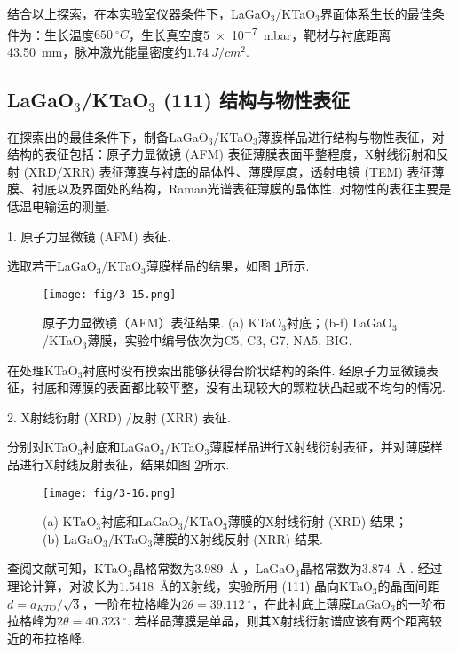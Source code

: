 \documentclass[12pt,a4paper,openany,twoside,UTF-8]{book}
\begin{document}
结合以上探索，在本实验室仪器条件下，LaGaO$_3$/KTaO$_3$界面体系生长的最佳条件为：生长温度$\SI{650}{^\circ C}$，生长真空度\SI{5e-7}{mbar}，靶材与衬底距离\SI{43.50}{mm}，脉冲激光能量密度约$\SI{1.74}{J/cm^2}$.

\subsection{LaGaO$_3$/KTaO$_3$ (111) 结构与物性表征}
在探索出的最佳条件下，制备LaGaO$_3$/KTaO$_3$薄膜样品进行结构与物性表征，对结构的表征包括：原子力显微镜 (AFM) 表征薄膜表面平整程度，X射线衍射和反射 (XRD/XRR) 表征薄膜与衬底的晶体性、薄膜厚度，透射电镜 (TEM) 表征薄膜、衬底以及界面处的结构，Raman光谱表征薄膜的晶体性. 对物性的表征主要是低温电输运的测量.

1. 原子力显微镜 (AFM) 表征. 

选取若干LaGaO$_3$/KTaO$_3$薄膜样品的结果，如图 \ref{fig:3-15}所示. 

\begin{figure}[htbp]
\centering
\texttt{[image: fig/3-15.png]}
\caption{原子力显微镜（AFM）表征结果. (a) KTaO$_3$衬底；(b-f) LaGaO$_3$/KTaO$_3$薄膜，实验中编号依次为C5, C3, G7, NA5, BIG.}
\label{fig:3-15} 
\end{figure}

在处理KTaO$_3$衬底时没有摸索出能够获得台阶状结构的条件. 经原子力显微镜表征，衬底和薄膜的表面都比较平整，没有出现较大的颗粒状凸起或不均匀的情况. 

2. X射线衍射 (XRD) /反射 (XRR) 表征. 

分别对KTaO$_3$衬底和LaGaO$_3$/KTaO$_3$薄膜样品进行X射线衍射表征，并对薄膜样品进行X射线反射表征，结果如图 \ref{fig:3-16}所示.

\begin{figure}[htbp]
\centering
\texttt{[image: fig/3-16.png]}
\caption{(a) KTaO$_3$衬底和LaGaO$_3$/KTaO$_3$薄膜的X射线衍射 (XRD) 结果；\\
(b) LaGaO$_3$/KTaO$_3$薄膜的X射线反射 (XRR) 结果.
}
\label{fig:3-16} 
\end{figure}

查阅文献可知，KTaO$_3$晶格常数为\SI{3.989}{Å} \cite{ref13}，LaGaO$_3$晶格常数为\SI{3.874}{Å} \cite{ref39}. 经过理论计算，对波长为\SI{1.5418}{Å}的X射线，实验所用 (111) 晶向KTaO$_3$的晶面间距$d = a_{KTO}/\sqrt{3}$，一阶布拉格峰为$2\theta = \SI{39.112}{^\circ}$，在此衬底上薄膜LaGaO$_3$的一阶布拉格峰为$2\theta = \SI{40.323}{^\circ}$. 若样品薄膜是单晶，则其X射线衍射谱应该有两个距离较近的布拉格峰.
\end{document}
